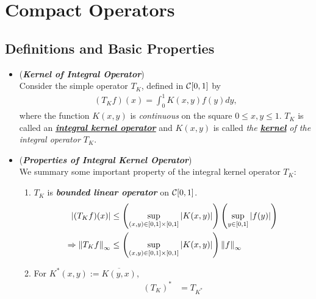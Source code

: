 \documentclass[11pt]{article}
\begin{document}
\section{Compact Operators}
\subsection{Definitions and Basic Properties}
\begin{itemize}
\item \begin{definition} (\emph{\textbf{Kernel of Integral Operator}})\\
Consider the simple operator $T_{K}$, defined in ${\mathcal C}[0, 1]$ by 
\begin{align*}
(T_{K}f)(x) = \int_{0}^{1} K(x, y)f(y) dy,
\end{align*} where the function $K(x, y)$ is \emph{continuous} on the square $0\le x, y \le 1$.  $T_{K}$ is called an \underline{\emph{\textbf{integral kernel operator}}} and $K(x, y)$ is called \emph{the \underline{\textbf{kernel}} of the integral operator $T_K$}. 
\end{definition}

\item \begin{remark} (\emph{\textbf{Properties of Integral Kernel Operator}})\\
We summary some important property of the integral kernel operator $T_K$:
\begin{enumerate}
\item $T_K$ is \emph{\textbf{bounded linear operator}} on ${\mathcal C}[0,1]$.
\begin{align*}
\left\lvert (T_{K}f)(x) \right\rvert &\le \left(\sup_{(x,y) \in [0,1]\times [0,1]}\left\lvert K(x,y) \right\rvert\right)\left(\sup_{y\in [0,1]}\left\lvert f(y) \right\rvert\right)\\
\Rightarrow \left\|T_K f\right\|_{\infty} & \le \left(\sup_{(x,y) \in [0,1]\times [0,1]}\left\lvert K(x,y) \right\rvert\right)\left\|f\right\|_{\infty}
\end{align*}

\item For $K^{*}(x, y) := \overline{K(y, x)}$, 
\begin{align*}
(T_{K})^{*} &= T_{K^{*}}
\end{align*}


\end{enumerate}
\end{remark}
\end{itemize}
\end{document}

